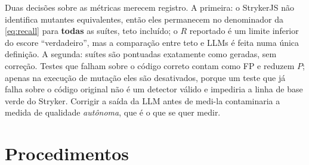 Duas decisões sobre as métricas merecem registro. A primeira: o StrykerJS não identifica mutantes equivalentes, então eles permanecem no denominador da \autoref{eq:recall} para \textbf{todas} as suítes, teto incluído; o $R$ reportado é um limite inferior do escore ``verdadeiro'', mas a comparação entre teto e LLMs é feita numa única definição. A segunda: suítes são pontuadas exatamente como geradas, sem correção. Testes que falham sobre o código correto contam como FP e reduzem $P$; apenas na execução de mutação eles são desativados, porque um teste que já falha sobre o código original não é um detector válido e impediria a linha de base verde do Stryker. Corrigir a saída da LLM antes de medi-la contaminaria a medida de qualidade \textit{autônoma}, que é o que se quer medir.

\section{Procedimentos}


